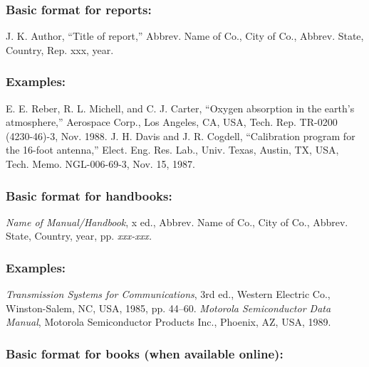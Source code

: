 \documentclass{IEEEoj}
\begin{document}
\subsubsection*{Basic format for reports:}

\begin{thebibliography}{00}
 J. K. Author, ``Title of report,'' Abbrev. Name of Co., City of Co., Abbrev.
State, Country, Rep. {xxx}, year.
\end{thebibliography}

\subsubsection*{Examples:}

\begin{thebibliography}{00}
 E. E. Reber, R. L. Michell, and C. J. Carter, ``Oxygen absorption in the earth's atmosphere,'' Aerospace Corp., Los Angeles, CA, USA, Tech. Rep. TR-0200 (4230-46)-3, Nov. 1988.
 J. H. Davis and J. R. Cogdell, ``Calibration program for the 16-foot antenna,'' Elect. Eng. Res. Lab., Univ. Texas, Austin, TX, USA, Tech. Memo. NGL-006-69-3, Nov. 15, 1987.
\end{thebibliography}

\subsubsection*{Basic format for handbooks:}

\begin{thebibliography}{00}
 \textit{Name of Manual/Handbook}, x ed., Abbrev. Name of Co., City of Co., Abbrev. State, Country, year, pp.
\textit{xxx-xxx.}
\end{thebibliography}

\subsubsection*{Examples:}

\begin{thebibliography}{00}
 \textit{Transmission Systems for Communications}, 3rd ed., Western Electric Co., Winston-Salem, NC, USA, 1985, pp. 44--60.
 \textit{Motorola Semiconductor Data Manual}, Motorola Semiconductor Products Inc., Phoenix, AZ, USA, 1989.
\end{thebibliography}

\subsubsection*{Basic format for books (when available online): }
\end{document}
